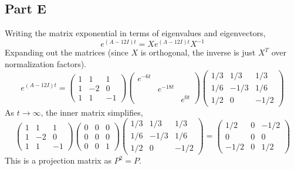 \documentclass{article}
\begin{document}
\subsection*{Part E}

Writing the matrix exponential in terms of eigenvalues and eigenvectors,
$$ e^{(A - 12I) t} = X e^{(\Lambda - 12 I) t} X^{-1} $$
Expanding out the matrices (since $X$ is orthogonal, the inverse is just
$X^T$ over normalization factors).
$$ e^{(A - 12I) t} = \begin{pmatrix}
  1 & 1 & 1 \\
  1 & -2 & 0 \\
  1 & 1 & -1
\end{pmatrix} \begin{pmatrix}
  e^{-6t} &  &  \\
   & e^{-18t} & \\
   & & e^{0t}
\end{pmatrix} \begin{pmatrix}
  1/3 & 1/3 & 1/3 \\
  1/6 & -1/3 & 1/6 \\
  1/2 & 0 & -1/2
\end{pmatrix} $$
As $t \longrightarrow \infty$, the inner matrix simplifies,
$$ \begin{pmatrix}
  1 & 1 & 1 \\
  1 & -2 & 0 \\
  1 & 1 & -1
\end{pmatrix} \begin{pmatrix}
  0 & 0 & 0 \\
  0 & 0 & 0 \\
  0 & 0 & 1
\end{pmatrix} \begin{pmatrix}
  1/3 & 1/3 & 1/3 \\
  1/6 & -1/3 & 1/6 \\
  1/2 & 0 & -1/2
\end{pmatrix} = \begin{pmatrix}
  1/2 & 0 & -1/2 \\
  0 & 0 & 0 \\
  -1/2 & 0 & 1/2
\end{pmatrix} $$
This is a projection matrix as $P^2 = P$.
\end{document}
